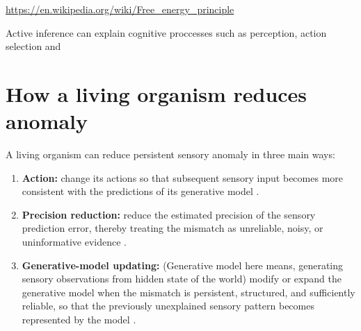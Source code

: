 \documentclass[a4paper]{article}
\title{}
\date{}
\author{Mohammad Rahmani}
\begin{document}
   \maketitle

   \url{https://en.wikipedia.org/wiki/Free_energy_principle}

   Active inference can explain cognitive proccesses such as perception, action selection and

   \section{How a living organism reduces anomaly}
      A living organism can reduce persistent sensory anomaly in three main ways:
      \begin{enumerate}
         \item \textbf{Action:} change its actions so that subsequent sensory input becomes more consistent with the predictions of its generative model \cite{friston-2010-action-and-behavior-a-free-energy-formulation}.
         \item \textbf{Precision reduction:} reduce the estimated precision of the sensory prediction error, thereby treating the mismatch as unreliable, noisy, or uninformative evidence \cite{feldman-2010-attention-uncertainty-and-free-energy}.
         \item \textbf{Generative-model updating:} (Generative model here means, generating sensory observations from hidden state of the world) modify or expand the generative model when the mismatch is persistent, structured, and sufficiently reliable, so that the previously unexplained sensory pattern becomes represented by the model \cite{neacsu-2026-reviewing-structure-learning-in-and-out-of-the-active-inference-framework}.
      \end{enumerate}

   
   
\end{document}
